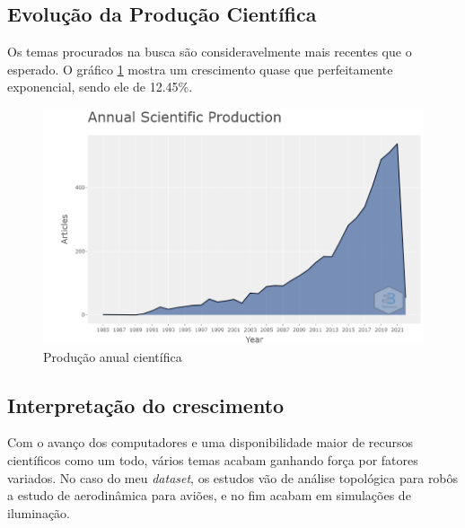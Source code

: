 \subsection{Evolução da Produção Científica}
    Os temas procurados na busca são consideravelmente mais recentes que o esperado. O gráfico \ref{fig:KvotheKS:Annual_Scientific} mostra um crescimento quase que perfeitamente exponencial, sendo ele de 12.45\%.
    \begin{figure}[H]
    \centering
    \includegraphics[width=1\textwidth]{experiments/KvotheKS/PesqBibliogr/AlgoritmosSimulacaoOptica-Dinamica/WoS-20220202/Dataset/Annual_Scientific.png}
    \caption{Produção anual científica}
    \label{fig:KvotheKS:Annual_Scientific}
\end{figure}
\subsection{Interpretação do crescimento}
    Com o avanço dos computadores e uma disponibilidade maior de recursos científicos como um todo, vários temas acabam ganhando força por fatores variados. No caso do meu \emph{dataset}, os estudos vão de análise topológica para robôs a estudo de aerodinâmica para aviões, e no fim acabam em simulações de iluminação.
